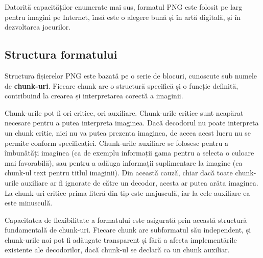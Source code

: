 \documentclass[a4paper,12pt]{report}
\begin{document}
Datorită capacităților enumerate mai sus, formatul \ac{PNG} este folosit
pe larg pentru imagini pe Internet, însă este o alegere bună și în artă digitală,
și în dezvoltarea jocurilor.


\subsection{Structura formatului}

Structura fișierelor \ac{PNG} este bazată pe o serie de blocuri,
cunoscute sub numele de \textbf{chunk-uri}.
Fiecare chunk are o structură specifică și o funcție definită,
contribuind la crearea și interpretarea corectă a imaginii.

Chunk-urile pot fi ori critice, ori auxiliare.
Chunk-urile critice sunt neapărat necesare pentru a putea interpreta imaginea.
Dacă decodorul nu poate interpreta un chunk critic, nici nu va putea prezenta imaginea,
de aceea acest lucru nu se permite conform specificației.
Chunk-urile auxiliare se folosesc pentru a îmbunătăți imaginea 
(ca de exemplu informații gama pentru a selecta o culoare mai favorabilă),
sau pentru a adăuga informații suplimentare la imagine
(ca chunk-ul text pentru titlul imaginii).
Din această cauză, chiar dacă toate chunk-urile auxiliare ar fi ignorate de către un decodor,
acesta ar putea arăta imaginea.
La chunk-uri critice prima literă din tip este majusculă,
iar la cele auxiliare ea este minusculă.

Capacitatea de flexibilitate a formatului este asigurată prin această structură fundamentală de chunk-uri.
Fiecare chunk are subformatul său independent,
și chunk-urile noi pot fi adăugate transparent și fără a afecta
implementările existente ale decodorilor,
dacă chunk-ul se declară ca un chunk auxiliar.
\end{document}
